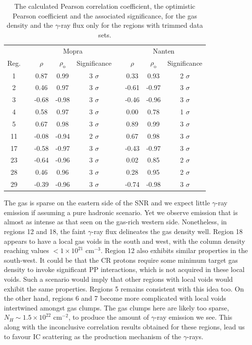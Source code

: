 \documentclass[12pt,a4paper]{article}
\begin{document}
\begin{table}[H] 
	\centering
	\begin{tabular}{ccccccccc}
		\toprule 
		&&
		\multicolumn{3}{c}{Mopra} 
		&&
		\multicolumn{3}{c}{Nanten} \\
		\cline{2-5} \cline{7-9} 
		Reg. && $\rho$ & $\rho_\mathrm{o}$ & Significance && $\rho$ & $\rho_\mathrm{o}$ & Significance \\
		\hline 
		1 && 0.87 & 0.99 & 3 $\sigma$ && 0.33 & 0.93 & 2 $\sigma$ \\
		2 && 0.46 & 0.97 & 3 $\sigma$ && -0.61 & -0.97 & 3 $\sigma$ \\
		3 && -0.68 & -0.98 & 3 $\sigma$ && -0.46 & -0.96 & 3 $\sigma$ \\
		4 && 0.58 & 0.97 & 3 $\sigma$ && 0.00 & 0.78 & 1 $\sigma$ \\
		5 && 0.67 & 0.98 & 3 $\sigma$ && 0.89 & 0.99 & 3 $\sigma$ \\
		11 && -0.08 & -0.94 & 2 $\sigma$ && 0.67 & 0.98 & 3 $\sigma$ \\
		17 && -0.58 & -0.97 & 3 $\sigma$ && -0.43 & -0.97 & 3 $\sigma$ \\
		23 && -0.64 & -0.96 & 3 $\sigma$ && 0.02 & 0.85 & 2 $\sigma$ \\
		28 && 0.46 & 0.96 & 3 $\sigma$ && 0.28 & 0.95 & 2 $\sigma$ \\
		29 && -0.39 & -0.96 & 3 $\sigma$ && -0.74 & -0.98 & 3 $\sigma$ \\
		\hline 
	\end{tabular} 
	\caption{The calculated Pearson correlation coefficient, the optimistic Pearson coefficient and the associated significance, for the gas density and the $\gamma$-ray flux only for the regions with trimmed data sets.}
	\label{tab:gasgammacor}
\end{table}


The gas is sparse on the eastern side of the SNR and we expect little $\gamma$-ray emission if assuming a pure hadronic scenario. 
Yet we observe emission that is almost as intense as that seen on the gas-rich western side.
Nonetheless, in regions 12 and 18, the faint $\gamma$-ray flux delineates the gas density well. 
Region 18 appears to have a local gas voids in the south and west, with the column density reaching values $<1 \times 10^{21}$ cm$^{-3}$.
Region 12 also exhibits similar properties in the south-west. 
It could be that the CR protons require some minimum target gas density to invoke significant PP interactions, which is not acquired in these local voids.
Such a scenario would imply that other regions with local voids would exhibit the same properties.
Regions 5 remains consistent with this idea too.
On the other hand, regions 6 and 7 become more complicated with local voids intertwined amongst gas clumps.
The gas clumps here are likely too sparse, $N_H \sim 1.5 \times 10^{22}$ cm$^{-2}$, to produce the amount of $\gamma$-ray emission we see. 
This along with the inconclusive correlation results obtained for these regions, lead us to favour IC scattering as the production mechanism of the $\gamma$-rays.
\end{document}
